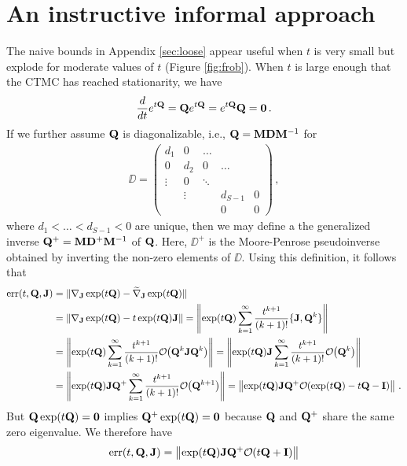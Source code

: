 \documentclass[12pt]{article} %
\newcommand{\order}[1]{{\cal O}\hspace{-0.2em}\left( #1 \right)}
\begin{document}
\section{An instructive informal approach}
The naive bounds in Appendix \ref{sec:loose} appear useful when $t$ is very small but explode for moderate values of $t$ (Figure \ref{fig:frob}).
 When $t$ is large enough that the CTMC has reached stationarity, we have 
 \begin{align*}
 	\frac{d}{dt}e^{t\mathbf{Q}} =  \mathbf{Q} e^{t\mathbf{Q}}=e^{t\mathbf{Q}} \mathbf{Q}  = \boldsymbol{0} \, .
 \end{align*}
 If we further assume $\mathbf{Q}$ is diagonalizable, i.e., $\mathbf{Q}=\mathbf{M} \mathbf{D} \mathbf{M}^{-1}$ for 
 \begin{align*}
 	\DD = \begin{pmatrix}
 		d_1& 0 &\dots & & \\
 		0  & d_2 &0  & \dots& \\
 		\vdots &0 & \ddots & \\
 		 & \vdots& & d_{S-1} &0 \\
 		 &&&0&0
 	\end{pmatrix} \, ,
 \end{align*}
 where $d_1<\dots <d_{S-1}<0$ are unique, then we may define a the generalized inverse $\mathbf{Q}^+=\mathbf{M} \mathbf{D}^{+} \mathbf{M}^{-1}$ of $\mathbf{Q}$. Here, $\DD^+$ is the Moore-Penrose pseudoinverse obtained by inverting the non-zero elements of $\DD$.  Using this definition, it follows that
		\begin{align*}
			\mbox{err}(t,\QQ,\JJ)	&=\lVert \nabla_{\JJ} \exp(t\QQ) - \widetilde{\nabla}_{\JJ} \exp(t\QQ) \rVert	\\
			&=\Vert\nabla_{\JJ} \exp(t\QQ) - t \exp(t\QQ)\JJ \Vert = \left\Vert \exp(t\QQ)  \sum_{k=1}^\infty \frac{t^{k+1}}{(k+1)!} \{\JJ,\QQ^k\} \right\Vert \\
			&=\left\Vert \exp(t\QQ)  \sum_{k=1}^\infty \frac{t^{k+1}}{(k+1)!} \order{\QQ^k \JJ \QQ^k}\right\Vert  = \left\Vert \exp(t\QQ) \JJ  \sum_{k=1}^\infty \frac{t^{k+1}}{(k+1)!}  \order{ \QQ^k}\right\Vert  \\
		&= \left\Vert \exp(t\QQ) \JJ \QQ^+ \sum_{k=1}^\infty \frac{t^{k+1}}{(k+1)!} \order{\QQ^{k+1}} \right\Vert = \left\Vert \exp(t\QQ) \JJ\QQ^+ \order{ \exp(t\QQ)-t\QQ-\II } \right\Vert  \, .
	\end{align*}
But $\mathbf{Q}\exp(t\mathbf{Q})= \boldsymbol{0}$ implies $\mathbf{Q}^+\exp(t\mathbf{Q})= \boldsymbol{0}$ because $\mathbf{Q}$ and $\mathbf{Q}^+$ share the same zero eigenvalue. We therefore have
\begin{align}\label{eq:err3}
	\mbox{err}(t,\QQ,\JJ) = \left\Vert \exp(t\QQ) \JJ \QQ^+\order{t\QQ+\II } \right\Vert 
\end{align}
\end{document}
